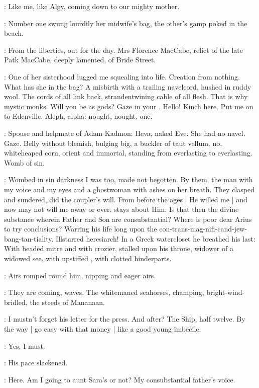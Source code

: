 \StephenInt:
Like me, like Algy,
coming down to our mighty mother.

:
Number one swung lourdily her midwife's bag,
the other's gamp poked in the beach.

:
From the liberties, out for the day.
Mrs Florence MacCabe,
relict of the late Patk MacCabe, deeply lamented,
of Bride Street.

\StephenInt:
One of her sisterhood lugged me squealing into life.
Creation from nothing.
What has she in the bag?
A misbirth with a trailing navelcord,
hushed in ruddy wool.
The cords of all link back,
strandentwining cable of all flesh.
That is why mystic monks.
Will you be as gods?
Gaze in your
.
Hello!
Kinch here.
Put me on to Edenville.
Aleph, alpha:
nought, nought, one.

\StephenInt:
Spouse and helpmate of Adam Kadmon:
Heva, naked Eve.
She had no navel.
Gaze.
Belly without blemish, bulging big,
a buckler of taut vellum,
no, whiteheaped corn,
orient and immortal,
standing from everlasting to everlasting.
Womb of sin.

\StephenInt:
Wombed in sin darkness I was too, made not begotten.
By them, the man with my voice and my eyes
and a ghostwoman with ashes on her breath.
They clasped and sundered, did the coupler's will.
From before the ages |
He willed me |
and now may not will me away or ever.
 stays about Him.
Is that then the divine substance wherein Father and Son are consubstantial?
Where is poor dear Arius to try conclusions?
Warring his life long upon the con-trans-mag-nifi-cand-jew-bang-tan-tiality.
Illstarred heresiarch!
In a Greek watercloset he breathed his last:
With beaded mitre and with crozier,
stalled upon his throne,
widower of a widowed see,
with upstiffed ,
with clotted hinderparts.

:
Airs romped round him, nipping and eager airs.

\StephenInt:
They are coming,
waves.
The whitemaned seahorses, champing,
bright-wind-bridled,
the steeds of Mananaan.

\StephenInt:
I mustn't forget his letter for the press.
And after?
The Ship, half twelve.
By the way |
go easy with that money |
like a good young imbecile.

\StephenInt:
Yes, I must.

:
His pace slackened.

\StephenInt:
Here.
Am I going to aunt Sara's or not?
My consubstantial father's voice.

